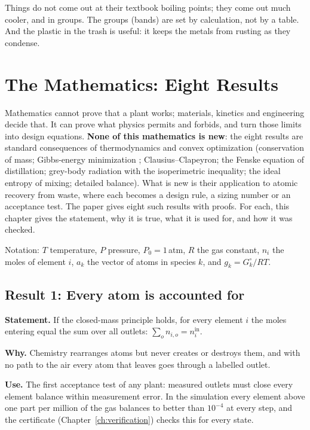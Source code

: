 \documentclass[11pt,a4paper]{article}
\begin{document}
\begin{plain}
Things do not come out at their textbook boiling points; they come out much cooler, and in groups. The groups (bands) are set by calculation, not by a table. And the plastic in the trash is useful: it keeps the metals from rusting as they condense.
\end{plain}

\section{The Mathematics: Eight Results}\label{ch:math}
Mathematics cannot prove that a plant works; materials, kinetics and engineering decide that. It can prove what physics permits and forbids, and turn those limits into design equations. \textbf{None of this mathematics is new}: the eight results are standard consequences of thermodynamics and convex optimization (conservation of mass; Gibbs-energy minimization \citep{gordon1994,boyd2004}; Clausius--Clapeyron; the Fenske equation of distillation; grey-body radiation with the isoperimetric inequality; the ideal entropy of mixing; detailed balance). What is new is their application to atomic recovery from waste, where each becomes a design rule, a sizing number or an acceptance test. The paper gives eight such results with proofs. For each, this chapter gives the statement, why it is true, what it is used for, and how it was checked.

Notation: $T$ temperature, $P$ pressure, $P_0 = 1$\,atm, $R$ the gas constant, $n_i$ the moles of element $i$, $a_k$ the vector of atoms in species $k$, and $g_k = G^\circ_k/RT$.

\subsection{Result 1: Every atom is accounted for}
\textbf{Statement.} If the closed-mass principle holds, for every element $i$ the moles entering equal the sum over all outlets: $\sum_{o} n_{i,o} = n_i^{\mathrm{in}}$.

\textbf{Why.} Chemistry rearranges atoms but never creates or destroys them, and with no path to the air every atom that leaves goes through a labelled outlet.

\textbf{Use.} The first acceptance test of any plant: measured outlets must close every element balance within measurement error. In the simulation every element above one part per million of the gas balances to better than $10^{-4}$ at every step, and the certificate (Chapter~\ref{ch:verification}) checks this for every state.
\end{document}
